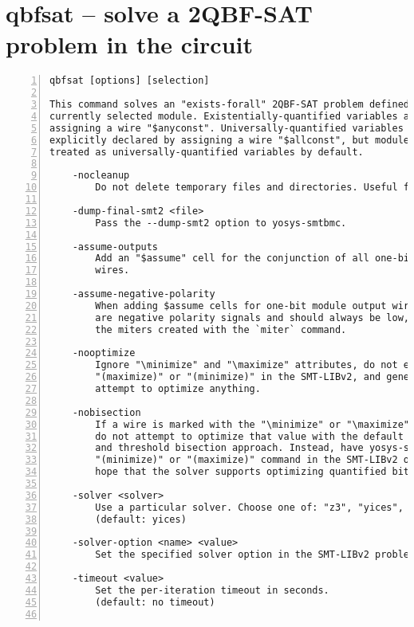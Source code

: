\section{qbfsat -- solve a 2QBF-SAT problem in the circuit}
\label{cmd:qbfsat}
\begin{lstlisting}[numbers=left,frame=single]
    qbfsat [options] [selection]

This command solves an "exists-forall" 2QBF-SAT problem defined over the
currently selected module. Existentially-quantified variables are declared by
assigning a wire "$anyconst". Universally-quantified variables may be
explicitly declared by assigning a wire "$allconst", but module inputs will be
treated as universally-quantified variables by default.

    -nocleanup
        Do not delete temporary files and directories. Useful for debugging.

    -dump-final-smt2 <file>
        Pass the --dump-smt2 option to yosys-smtbmc.

    -assume-outputs
        Add an "$assume" cell for the conjunction of all one-bit module output
        wires.

    -assume-negative-polarity
        When adding $assume cells for one-bit module output wires, assume they
        are negative polarity signals and should always be low, for example like
        the miters created with the `miter` command.

    -nooptimize
        Ignore "\minimize" and "\maximize" attributes, do not emit
        "(maximize)" or "(minimize)" in the SMT-LIBv2, and generally make no
        attempt to optimize anything.

    -nobisection
        If a wire is marked with the "\minimize" or "\maximize" attribute,
        do not attempt to optimize that value with the default iterated solving
        and threshold bisection approach. Instead, have yosys-smtbmc emit a
        "(minimize)" or "(maximize)" command in the SMT-LIBv2 output and
        hope that the solver supports optimizing quantified bitvector problems.

    -solver <solver>
        Use a particular solver. Choose one of: "z3", "yices", and "cvc4".
        (default: yices)

    -solver-option <name> <value>
        Set the specified solver option in the SMT-LIBv2 problem file.

    -timeout <value>
        Set the per-iteration timeout in seconds.
        (default: no timeout)


\end{lstlisting}
